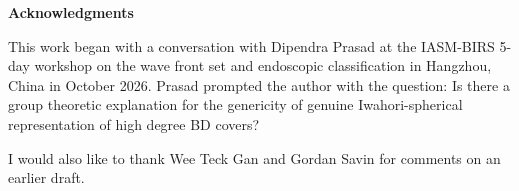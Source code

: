 \documentclass[11pt]{amsart}
\theoremstyle{plain}
\theoremstyle{definition}
\numberwithin{equation}{section}
\begin{document}
\newpage

\begin{center}{\bf Acknowledgments}\end{center}

This work began with a conversation with Dipendra Prasad at the IASM-BIRS 5-day workshop on the wave front set and endoscopic classification in Hangzhou, China in October 2026. Prasad prompted the author with the question: Is there a group theoretic explanation for the genericity of genuine Iwahori-spherical representation of high degree BD covers?

I would also like to thank Wee Teck Gan and Gordan Savin for comments on an earlier draft.



\end{document}

